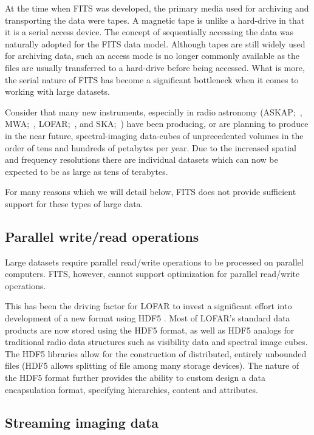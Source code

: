 \documentclass[final,authoryear,5p,times,twocolumn]{elsarticle}
\begin{document}
{{At the time when FITS was developed, the primary media used for
archiving and transporting the data were tapes. A magnetic tape is
unlike a hard-drive in that it is a serial access device.  The concept
of sequentially accessing the data was naturally adopted for the FITS data
model.  Although tapes are still widely used for archiving data,
such an access mode is no longer commonly available as the files are usually
transferred to a hard-drive before being accessed. What is more, the
serial nature of FITS has become a significant bottleneck when it comes
to working with large datasets.


Consider that many new instruments, especially in radio astronomy
(ASKAP;~\citealp{2009IEEEP..97.1507D},
MWA;~\citealp{2013PASA...30....7T}, LOFAR;~\citealp{2013A&A...556A...2V}, and
SKA;~\citealp{ska-exascale})
have been producing, or are planning to produce in the near future,
spectral-imaging data-cubes of unprecedented volumes in the order of
tens and hundreds of petabytes per year. Due to the increased spatial and frequency
resolutions there are individual datasets which can now be expected to be as
large as tens of terabytes.

For many reasons which we will detail below, FITS does not provide sufficient
support for these types of large data.

\subsection{Parallel write/read operations}
\label{subsection_parallel_io}

Large datasets require parallel read/write operations to be processed on
parallel computers.  FITS, however, cannot support optimization for parallel 
read/write operations.

This has been the driving factor for LOFAR to
invest a significant effort into development of a new format using
HDF5  \citep{2012ASPC..461..283A}. Most of LOFAR's standard data products
are now stored using the HDF5 format, as well as HDF5 analogs for traditional radio data
structures such as visibility data and spectral image cubes. The HDF5 libraries allow
for the construction of distributed, entirely unbounded files (HDF5 allows splitting
of file among many storage devices). The nature of the HDF5
format further provides the ability to custom design a data encapsulation format,
specifying hierarchies, content and attributes.

\subsection{Streaming imaging data}
\label{subsection_stream_image}

}}
\end{document}
